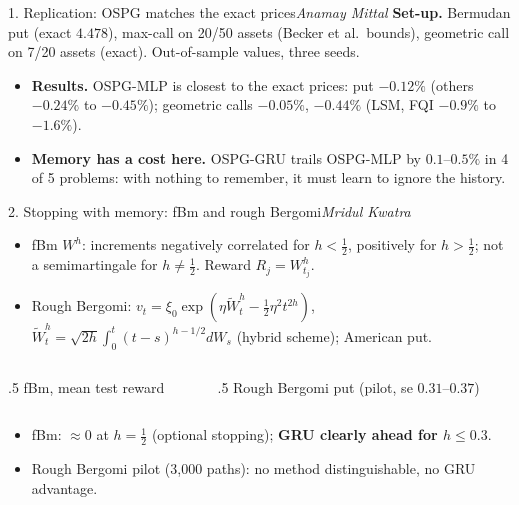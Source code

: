 \documentclass[aspectratio=169,11pt]{beamer}
\newcommand{\by}[1]{\hfill{\normalfont\small\itshape #1}}
\begin{document}
\begin{frame}{1. Replication: OSPG matches the exact prices\by{Anamay Mittal}}
\small
\textbf{Set-up.} Bermudan put (exact $4.478$), max-call on 20/50 assets (Becker et al.\ bounds),
geometric call on 7/20 assets (exact). Out-of-sample values, three seeds.

\vspace{4pt}
\centering\scriptsize


\vspace{4pt}\raggedright
\begin{itemize}\small
\item \textbf{Results.} OSPG-MLP is closest to the exact prices: put $-0.12\%$ (others $-0.24\%$ to
  $-0.45\%$); geometric calls $-0.05\%$, $-0.44\%$ (LSM, FQI $-0.9\%$ to $-1.6\%$).
\item \textbf{Memory has a cost here.} OSPG-GRU trails OSPG-MLP by $0.1$--$0.5\%$ in 4 of 5
  problems: with nothing to remember, it must learn to ignore the history.
\end{itemize}
\end{frame}

\begin{frame}{2. Stopping with memory: fBm and rough Bergomi\by{Mridul Kwatra}}
\small
\begin{itemize}
\item fBm $W^h$: increments negatively correlated for $h<\frac12$, positively for $h>\frac12$;
  not a semimartingale for $h\neq\frac12$. Reward $R_j=W^h_{t_j}$.
\item Rough Bergomi: $v_t=\xi_0\exp(\eta\widetilde W^h_t-\frac12\eta^2t^{2h})$,
  $\widetilde W^h_t=\sqrt{2h}\int_0^t(t-s)^{h-1/2}dW_s$ (hybrid scheme); American put.
\end{itemize}
\vspace{2pt}
\begin{columns}[T]
\begin{column}{.5\textwidth}\centering\scriptsize
fBm, mean test reward\\[2pt]
\resizebox{.95\linewidth}{!}{}
\end{column}
\begin{column}{.5\textwidth}\centering\scriptsize
Rough Bergomi put (pilot, se $0.31$--$0.37$)\\[2pt]
\resizebox{.95\linewidth}{!}{}
\end{column}
\end{columns}
\vspace{4pt}
\begin{itemize}
\item fBm: $\approx0$ at $h=\frac12$ (optional stopping); \textbf{GRU clearly ahead for $h\le0.3$}.
\item Rough Bergomi pilot (3{,}000 paths): no method distinguishable, no GRU advantage.
\end{itemize}
\end{frame}
\end{document}
